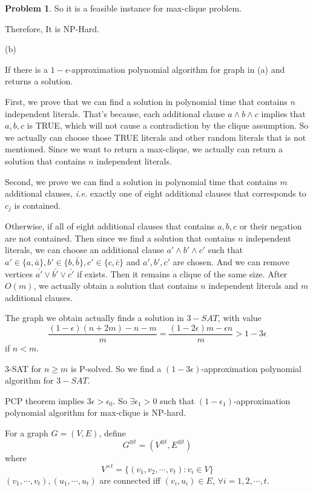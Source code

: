 \documentclass[a4paper]{article}
\theoremstyle{definition}
\newtheorem{problem}{Problem}
\theoremstyle{plain}
\numberwithin{equation}{problem}
\newcommand{\ie}{ \textit{ i.e. } }
\begin{document}
\begin{problem}
  So it is a feasible instance for max-clique problem.

  Therefore, It is NP-Hard.

  (b) 
  
  If there is a  $ 1-\epsilon $-approximation polynomial algorithm for graph in (a) and returns a solution. 

  First, we prove that we can find a solution in polynomial time that contains $ n $ independent literals. That's because, each additional clause  $ a\wedge b\wedge c $  implies that  $ a,b,c  $ is TRUE, which will not cause a contradiction by the clique assumption. So we actually can choose those TRUE literals and other random literals that is not mentioned. Since we want to return a max-clique, we actually can return a solution that contains  $ n  $ independent literals. 
  
  Second, we prove we can find a solution in polynomial time that contains  $ m  $ additional clauses, \ie exactly one of eight additional clauses that corresponds to  $ c_j $ is contained.

  Otherwise, if all of eight additional clauses that contains  $ a,b,c $ or their negation  are not contained. Then since we find a solution that contains  $ n $ independent literals, we can choose an additional clause  $ a'\wedge b'\wedge c' $ such that  $ a'\in\{a,\bar{a}\},b'\in\{b,\bar{b}\},c'\in \{c,\bar{c}\} $ and  $ a',b',c' $  are chosen. And we can remove vertices  $ \bar{a'}\vee \bar{b'}\vee \bar{c'} $  if exists. Then it remains a clique of the same size. After  $ O(m) $, we actually obtain a solution that contains  $ n $ independent literals and  $ m $ additional clauses.  
  
  The graph we obtain actually finds a solution in  $ 3-SAT $, with value 
  \[\frac{(1-\epsilon)(n+2m)-n-m}{m}=\frac{(1-2\epsilon)m-\epsilon n}{m}>1-3\epsilon\]
  if  $ n<m $.
  
  3-SAT for $ n \geq m $ is P-solved. So we find a  $ (1-3\epsilon) $-approximation polynomial algorithm for  $ 3-SAT $.
  
  PCP theorem implies  $ 3\epsilon>\epsilon_0 $. So  $ \exists \epsilon_1>0 $  such that  $ (1-\epsilon_1) $-approximation polynomial algorithm for  max-clique is NP-hard.
  
  For a graph  $ G=(V,E) $, define 
  \[G^{\otimes t}=(V^{\otimes t},E^{\otimes t})\]
  where 
  \[V^{\times t}=\{(v_1,v_2,\cdots,v_t):v_i\in V\}\]
  $ (v_1,\cdots,v_t),(u_1,\cdots,u_t) $ are connected iff  $ (v_i,u_i)\in E $, $ \forall i=1,2,\cdots,t $.  
  

\end{problem}
\end{document}
